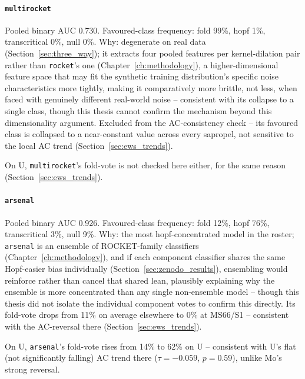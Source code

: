 \paragraph{\texttt{multirocket}} Pooled binary AUC 0.730. Favoured-class frequency: fold 99\%, hopf 1\%, transcritical 0\%, null 0\%. Why: degenerate on real data (Section~\ref{sec:three_way}); it extracts four pooled features per kernel-dilation pair rather than \texttt{rocket}'s one (Chapter~\ref{ch:methodology}), a higher-dimensional feature space that may fit the synthetic training distribution's specific noise characteristics more tightly, making it comparatively more brittle, not less, when faced with genuinely different real-world noise -- consistent with its collapse to a single class, though this thesis cannot confirm the mechanism beyond this dimensionality argument. Excluded from the AC-consistency check -- its favoured class is collapsed to a near-constant value across every sapropel, not sensitive to the local AC trend (Section~\ref{sec:ews_trends}).

On U, \texttt{multirocket}'s fold-vote is not checked here either, for the same reason (Section~\ref{sec:ews_trends}).

\paragraph{\texttt{arsenal}} Pooled binary AUC 0.926. Favoured-class frequency: fold 12\%, hopf 76\%, transcritical 3\%, null 9\%. Why: the most hopf-concentrated model in the roster; \texttt{arsenal} is an ensemble of ROCKET-family classifiers (Chapter~\ref{ch:methodology}), and if each component classifier shares the same Hopf-easier bias individually (Section~\ref{sec:zenodo_results}), ensembling would reinforce rather than cancel that shared lean, plausibly explaining why the ensemble is more concentrated than any single non-ensemble model -- though this thesis did not isolate the individual component votes to confirm this directly. Its fold-vote drops from 11\% on average elsewhere to 0\% at MS66/S1 -- consistent with the AC-reversal there (Section~\ref{sec:ews_trends}).

On U, \texttt{arsenal}'s fold-vote rises from 14\% to 62\% on U -- consistent with U's flat (not significantly falling) AC trend there ($\tau=-0.059$, $p=0.59$), unlike Mo's strong reversal.


